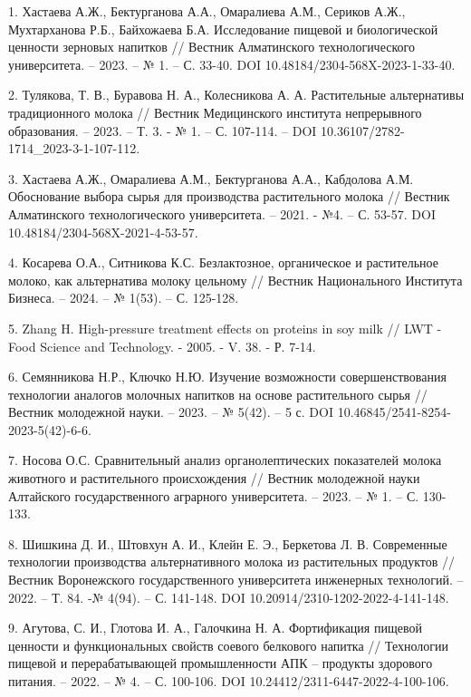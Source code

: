 \begin{noparindent}
1. Хастаева А.Ж., Бектурганова А.А., Омаралиева А.М., Сериков А.Ж.,
Мухтарханова Р.Б., Байхожаева Б.А. Исследование пищевой и биологической
ценности зерновых напитков // Вестник Алматинского технологического
университета. -- 2023. -- № 1. -- С. 33-40. DOI
10.48184/2304-568X-2023-1-33-40.

2. Тулякова, Т. В., Буравова Н. А., Колесникова А. А. Растительные
альтернативы традиционного молока // Вестник Медицинского института
непрерывного образования. -- 2023. -- Т. 3. - № 1. -- С. 107-114. -- DOI
10.36107/2782-1714\_2023-3-1-107-112.

3. Хастаева А.Ж., Омаралиева А.М., Бектурганова А.А., Кабдолова А.М.
Обоснование выбора сырья для производства растительного молока //
Вестник Алматинского технологического университета. -- 2021. - №4. -- С.
53-57. DOI 10.48184/2304-568X-2021-4-53-57.

4. Косарева О.А., Ситникова К.С. Безлактозное, органическое и
растительное молоко, как альтернатива молоку цельному // Вестник
Национального Института Бизнеса. -- 2024. -- № 1(53). -- С. 125-128.

5. Zhang H. High-pressure treatment effects on proteins in soy milk //
LWT - Food Science and Technology. - 2005. - V. 38. - Р. 7-14.

6. Семянникова Н.Р., Ключко Н.Ю. Изучение возможности совершенствования
технологии аналогов молочных напитков на основе растительного сырья //
Вестник молодежной науки. -- 2023. -- № 5(42). -- 5 с. DOI
10.46845/2541-8254-2023-5(42)-6-6.

7. Носова О.С. Сравнительный анализ органолептических показателей молока
животного и растительного происхождения // Вестник молодежной науки
Алтайского государственного аграрного университета. -- 2023. -- № 1. --
С. 130-133.

8. Шишкина Д. И., Штовхун А. И., Клейн Е. Э., Беркетова Л. В.
Современные технологии производства альтернативного молока из
растительных продуктов // Вестник Воронежского государственного
университета инженерных технологий. -- 2022. -- Т. 84. -№ 4(94). -- С.
141-148. DOI 10.20914/2310-1202-2022-4-141-148.

9. Агутова, С. И., Глотова И. А., Галочкина Н. А. Фортификация пищевой
ценности и функциональных свойств соевого белкового напитка //
Технологии пищевой и перерабатывающей промышленности АПК -- продукты
здорового питания. -- 2022. -- № 4. -- С. 100-106. DOI
10.24412/2311-6447-2022-4-100-106.


\end{noparindent}
